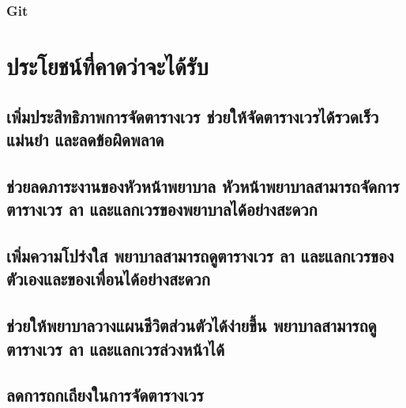 \hspace{1cm}\subsubsection{Git}

\section{ประโยชน์ที่คาดว่าจะได้รับ}

\renewcommand{\thesubsubsection}{\thesubsection\arabic{subsubsection}.}

\hspace{0cm}\hangindent=4.9cm\subsection{เพิ่มประสิทธิภาพการจัดตารางเวร ช่วยให้จัดตารางเวรได้รวดเร็วแม่นยำ และลดข้อผิดพลาด}

\hspace{0cm}\hangindent=2.25cm\subsection{ช่วยลดภาระงานของหัวหน้าพยาบาล หัวหน้าพยาบาลสามารถจัดการตารางเวร ลา และแลกเวรของพยาบาลได้อย่างสะดวก}

\hspace{0cm}\hangindent=2.25cm\subsection{เพิ่มความโปร่งใส พยาบาลสามารถดูตารางเวร ลา และแลกเวรของตัวเองและของเพื่อนได้อย่างสะดวก}

\hspace{0cm}\hangindent=2.25cm\subsection{ช่วยให้พยาบาลวางแผนชีวิตส่วนตัวได้ง่ายขึ้น พยาบาลสามารถดูตารางเวร ลา และแลกเวรล่วงหน้าได้}

\hspace{0cm}\hangindent=2.25cm\subsection{ลดการถกเถียงในการจัดตารางเวร}







